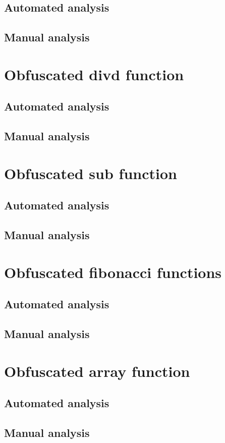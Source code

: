 \documentclass[10pt,twoside,a4paper,bibliography=totoc]{scrbook}
\begin{document}
\subsection{Automated analysis}
\subsection{Manual analysis}
\section{Obfuscated divd function}
\subsection{Automated analysis}
\subsection{Manual analysis}
\section{Obfuscated sub function}
\subsection{Automated analysis}
\subsection{Manual analysis}
\section{Obfuscated fibonacci functions}
\subsection{Automated analysis}
\subsection{Manual analysis}
\section{Obfuscated array function}
\subsection{Automated analysis}
\subsection{Manual analysis}
\end{document}
